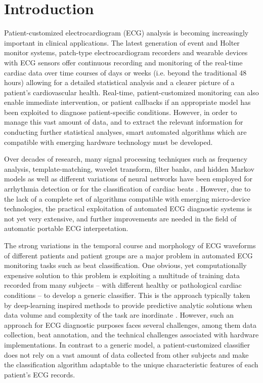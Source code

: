 \documentclass[review]{elsarticle}
\begin{document}
\section{Introduction}
Patient-customized electrocardiogram (ECG) analysis is becoming increasingly important in clinical applications. The latest generation of event and Holter monitor systems, patch-type electrocardiogram recorders \cite{yan20100} and wearable devices with ECG sensors \cite{dias2018wearable} offer continuous recording and monitoring of the real-time cardiac data over time courses of days or weeks (i.e. beyond the traditional 48 hours) allowing for a detailed statistical analysis and a clearer picture of a patient's cardiovascular health. Real-time, patient-customized monitoring can also enable immediate intervention, or patient callbacks if an appropriate model has been exploited to diagnose patient-specific conditions. However, in order to manage this vast amount of data, and to extract the relevant information for conducting further statistical analyses, smart automated algorithms which are compatible with emerging hardware technology must be developed.

Over decades of research, many signal processing techniques such as frequency analysis, template-matching, wavelet transform, filter banks, and hidden Markov models as well as different variations of neural networks have been employed for arrhythmia detection or for the classification of cardiac beats \cite{hu1997patient,christov2006comparative,faezipour2010patient,mateo2016efficient}. However, due to the lack of a complete set of algorithms compatible with emerging micro-device technologies, the practical exploitation of automated ECG diagnostic systems is not yet very extensive, and further improvements are needed in the field of automatic portable ECG interpretation.

The strong variations in the temporal course and morphology of ECG waveforms of different patients and patient groups are a major problem in automated ECG monitoring tasks such as beat classification. One obvious, yet computationally expensive solution to this problem is exploiting a multitude of training data recorded from many subjects -- with different healthy or pathological cardiac conditions -- to develop a generic classifier. This is the approach typically taken by deep-learning inspired methods to provide predictive analytic solutions when data volume and complexity of the task are inordinate \cite {kiranyaz2016real,kachuee2018ecg}. However, such an approach for ECG diagnostic purposes faces several challenges, among them data collection, beat annotation, and the technical challenges associated with hardware implementations. In contrast to a generic model, a patient-customized classifier does not rely on a vast amount of data collected from other subjects and make the classification algorithm adaptable to the unique characteristic features of each patient’s ECG records.
\end{document}
